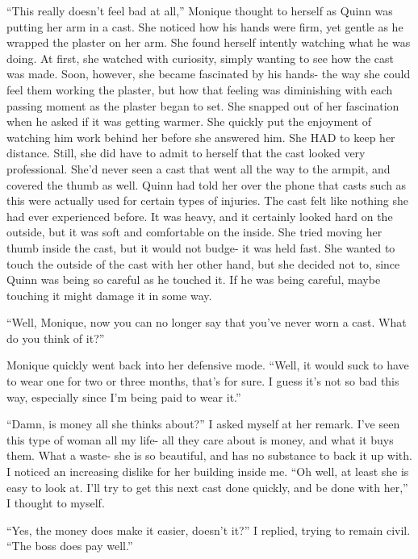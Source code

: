 \begin{thought}
    ``This really doesn't feel bad at all,'' Monique thought to herself as Quinn was putting her
arm in a cast. She noticed how his hands were firm, yet gentle as he wrapped the plaster on her
arm. She found herself intently watching what he was doing. At first, she watched with
curiosity, simply wanting to see how the cast was made. Soon, however, she became fascinated by
his hands- the way she could feel them working the plaster, but how that feeling was diminishing
with each passing moment as the plaster began to set. She snapped out of her fascination when he
asked if it was getting warmer. She quickly put the enjoyment of watching him work behind her
before she answered him. She HAD to keep her distance. Still, she did have to admit to herself
that the cast looked very professional. She'd never seen a cast that went all the way to the
armpit, and covered the thumb as well. Quinn had told her over the phone that casts such as this
were actually used for certain types of injuries. The cast felt like nothing she had ever
experienced before. It was heavy, and it certainly looked hard on the outside, but it was soft
and comfortable on the inside. She tried moving her thumb inside the cast, but it would not
budge- it was held fast. She wanted to touch the outside of the cast with her other hand, but
she decided not to, since Quinn was being so careful as he touched it. If he was being careful,
maybe touching it might damage it in some way.
\end{thought}

    ``Well, Monique, now you can no longer say that you've never worn a cast. What do you think
of it?''

    Monique quickly went back into her defensive mode. ``Well, it would suck to have to wear one
for two or three months, that's for sure. I guess it's not so bad this way, especially since I'm
being paid to wear it.''

    ``Damn, is money all she thinks about?'' I asked myself at her remark. I've seen this type
of woman all my life- all they care about is money, and what it buys them. What a waste- she is
so beautiful, and has no substance to back it up with. I noticed an increasing dislike for her
building inside me. ``Oh well, at least she is easy to look at. I'll try to get this next cast
done quickly, and be done with her,'' I thought to myself.

    ``Yes, the money does make it easier, doesn't it?'' I replied, trying to remain civil. ``The
boss does pay well.''


